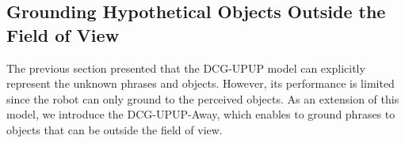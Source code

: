%

\subsection{Grounding Hypothetical Objects Outside the Field of View}
The previous section presented that the DCG-UPUP model can explicitly represent the unknown phrases and objects. However, its performance is limited since the robot can only ground to the perceived objects. As an extension of this model, we introduce the DCG-UPUP-Away, which enables to ground phrases to objects that can be outside the field of view.

